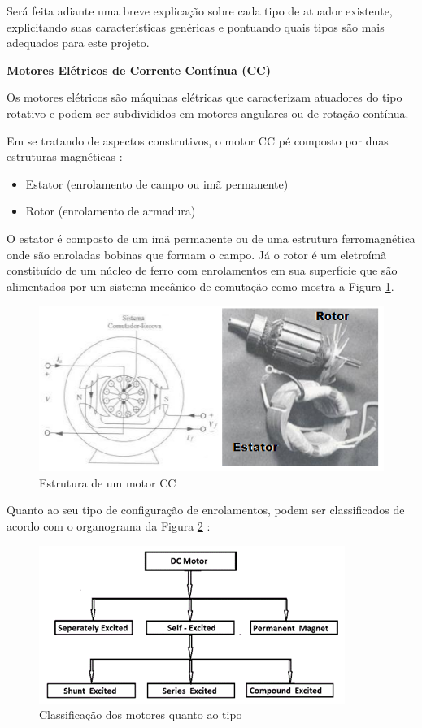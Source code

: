 \begin{anexosenv}
Será feita adiante uma breve explicação sobre cada tipo de atuador existente, explicitando suas características genéricas e pontuando quais tipos são mais adequados para este projeto.

\textbf{Motores Elétricos de Corrente Contínua (CC)}

Os motores elétricos são máquinas elétricas que caracterizam atuadores do tipo rotativo e podem ser subdivididos em motores angulares ou de rotação contínua. 

Em se tratando de aspectos construtivos, o motor CC pé composto por duas estruturas magnéticas \cite{siemens}:
\begin{itemize}
	\item Estator (enrolamento de campo ou imã permanente)
	\item Rotor (enrolamento de armadura)
\end{itemize}

O estator é composto de um imã permanente ou de uma estrutura ferromagnética onde são enroladas bobinas que formam o campo. Já o rotor é um eletroímã  constituído de um núcleo de ferro com enrolamentos em sua superfície que são alimentados por um sistema mecânico de comutação como mostra a Figura \ref{estruturamotor}.

\begin{figure}[htb]
		\centering
			\includegraphics[scale=0.9]{figuras/estruturamotorcc.png}
		\caption{Estrutura de um motor CC \cite{siemens}}
		\label{estruturamotor}
\end{figure}

Quanto ao seu tipo de configuração de enrolamentos, podem ser classificados de acordo com o organograma da Figura \ref{fig19} \cite{siteeducation}:

\begin{figure}[htb]
		\centering
			\includegraphics[scale=0.9]{figuras/motores1.png}
		\caption{Classificação dos motores quanto ao tipo \cite{siteeducation}}
		\label{fig19}
\end{figure}


\end{anexosenv}
